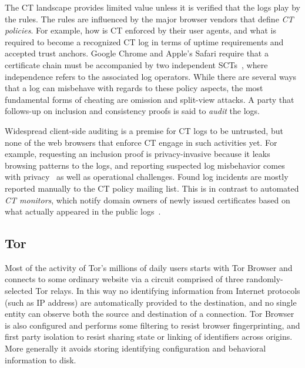 The CT landscape provides limited value unless it is verified that the logs
play by the rules.  The rules are influenced by the major browser vendors that
define \emph{CT policies}.  For example, how is CT enforced by their user
agents, and what is required to become a recognized CT log in terms of uptime
requirements and accepted trust anchors.  Google Chrome and Apple's Safari
require that a certificate chain must be accompanied by two independent
SCTs~\cite{chrome-policy,safari-policy}, where independence refers to the
associated log operators.  While there are several ways that a log can misbehave
with regards to these policy aspects, the most fundamental forms of cheating are
omission and split-view attacks.  A party that follows-up on inclusion and
consistency proofs is said to \emph{audit} the logs.

Widespread client-side auditing is a premise for CT logs to be untrusted, but
none of the web browsers that enforce CT engage in such activities yet.  For
example, requesting an inclusion proof is privacy-invasive because it leaks
browsing patterns to the logs, and reporting suspected log misbehavior comes
with privacy~\cite{ct-with-privacy} as well as operational challenges.
Found log incidents are mostly reported manually to the CT policy mailing list.
This is in contrast to automated \emph{CT monitors}, which notify domain owners
of newly issued certificates based on what actually appeared in the public
logs~\cite{lwm,ct-monitors}.

\subsection{Tor} \label{sec:background:tor}

Most of the activity of Tor's millions of daily users starts with Tor Browser
and connects to some ordinary website via a circuit comprised of three
randomly-selected Tor relays. In this way no identifying information from
Internet protocols (such as IP address) are automatically provided to the
destination, and no single entity can observe both the source and destination of
a connection. Tor Browser is also configured and performs some filtering to resist
browser fingerprinting, and first party isolation to resist sharing state or
linking of identifiers across origins. More generally it avoids storing
identifying configuration and behavioral information to disk.

